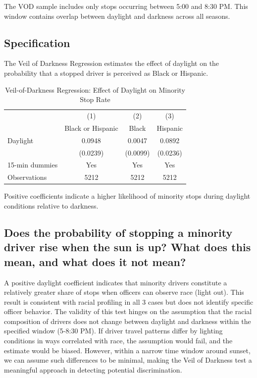 \documentclass[11pt]{article}
\begin{document}
The VOD sample includes only stops occurring between 5:00 and 8:30 PM. This
window contains overlap between daylight and darkness across all seasons.

\subsection*{Specification}

The Veil of Darkness Regression estimates the effect of daylight on the probability that
a stopped driver is perceived as Black or Hispanic.

\begin{table}[H]
  \centering
  \caption{Veil-of-Darkness Regression: Effect of Daylight on Minority Stop Rate}
  \label{tab:vod}
  \begin{threeparttable}
    \begin{tabular}{lccc}
      \toprule
      & (1) & (2) & (3) \\
      & Black or Hispanic & Black & Hispanic \\
      \midrule
      Daylight 
      & 0.0948 
      & 0.0047 
      & 0.0892 \\
      & (0.0239) 
      & (0.0099) 
      & (0.0236) \\
      \midrule
      15-min dummies & Yes & Yes & Yes \\
      Observations & 5212 & 5212 & 5212 \\
      \bottomrule
    \end{tabular}
    \begin{tablenotes}[flushleft]
      \footnotesize
      \item Positive coefficients indicate a higher likelihood of minority stops during daylight conditions relative to darkness.
    \end{tablenotes}
  \end{threeparttable}
\end{table}

\subsection*{Does the probability of stopping a minority driver rise when the sun is up? What does this mean, and what does it not mean?}

A positive daylight coefficient indicates that minority drivers constitute a
relatively greater share of stops when officers can observe race (light out). This result is consistent with racial profiling in all 3 cases but does not identify specific officer behavior. The validity of this test hinges on the assumption that the racial composition of drivers does not change between daylight and darkness within
the specified window (5-8:30 PM). If driver travel patterns differ by lighting conditions in ways correlated with race, the assumption would fail, and the estimate would be biased. However, within a narrow time window around sunset, we can assume such differences to be minimal, making the Veil of Darkness test a meaningful approach in detecting potential discrimination.
\end{document}
